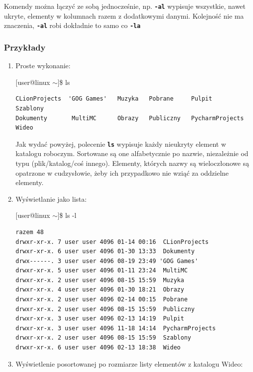 \documentclass[12pt]{article}
\makeatletter
\newcommand{\ttbf}[1]{
    \texttt{\textbf{#1}}
}
\newenvironment{console1}
{
    \ttfamily
    \fontseries{b}
    \selectfont
    {[}user@linux $\sim${]}\$} {

    }
\makeatother
\begin{document}
Komendy można łączyć ze sobą jednocześnie, np. \ttbf{-al} wypisuje wszystkie, nawet ukryte, elementy w kolumnach razem z dodatkowymi danymi. Kolejność nie ma znaczenia, \ttbf{-al} robi dokładnie to samo co \ttbf{-la}

\subsubsection{Przykłady}
\begin{enumerate}

    \item Proste wykonanie:

    \begin{console1}
    ls
\end{console1}

\begin{verbatim}
CLionProjects  'GOG Games'   Muzyka   Pobrane     Pulpit            Szablony
Dokumenty       MultiMC      Obrazy   Publiczny   PycharmProjects   Wideo
\end{verbatim}

Jak wydać powyżej, polecenie \ttbf{ls} wypisuje każdy nieukryty element w katalogu roboczym. Sortowane są one alfabetycznie po nazwie, niezależnie od typu (plik/katalog/coś innego). Elementy, których nazwy są wieloczłonowe są opatrzone w cudzysłowie, żeby ich przypadkowo nie wziąć za oddzielne elementy.

\item Wyświetlanie jako lista:

\begin{console1}
    ls -l
\end{console1}

\begin{verbatim}
razem 48
drwxr-xr-x. 7 user user 4096 01-14 00:16  CLionProjects
drwxr-xr-x. 6 user user 4096 01-30 13:33  Dokumenty
drwx------. 3 user user 4096 08-19 23:49 'GOG Games'
drwxr-xr-x. 5 user user 4096 01-11 23:24  MultiMC
drwxr-xr-x. 2 user user 4096 08-15 15:59  Muzyka
drwxr-xr-x. 4 user user 4096 01-30 18:21  Obrazy
drwxr-xr-x. 2 user user 4096 02-14 00:15  Pobrane
drwxr-xr-x. 2 user user 4096 08-15 15:59  Publiczny
drwxr-xr-x. 3 user user 4096 02-13 14:19  Pulpit
drwxr-xr-x. 3 user user 4096 11-18 14:14  PycharmProjects
drwxr-xr-x. 2 user user 4096 08-15 15:59  Szablony
drwxr-xr-x. 6 user user 4096 02-13 18:38  Wideo
\end{verbatim}

\item Wyświetlenie posortowanej po rozmiarze listy elementów z katalogu Wideo:


\end{enumerate}
\end{document}

